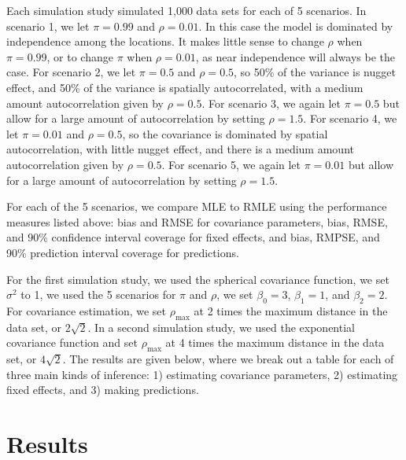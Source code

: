 \documentclass[12pt, titlepage]{article}
\begin{document}
Each simulation study simulated 1,000 data sets for each of 5 scenarios.  In scenario 1, we let $\pi = 0.99$ and $\rho = 0.01$.  In this case the model is dominated by independence among the locations.  It makes little sense to change $\rho$ when $\pi = 0.99$, or to change $\pi$ when $\rho = 0.01$, as near independence will always be the case.  For scenario 2, we let $\pi = 0.5$ and $\rho = 0.5$, so 50\% of the variance is nugget effect, and 50\% of the variance is spatially autocorrelated, with a medium amount autocorrelation given by $\rho = 0.5$.  For scenario 3, we again let $\pi = 0.5$ but allow for a large amount of autocorrelation by setting $\rho = 1.5$.  For scenario 4, we let $\pi = 0.01$ and $\rho = 0.5$, so the covariance is dominated by spatial autocorrelation, with little nugget effect, and there is a medium amount autocorrelation given by $\rho = 0.5$.  For scenario 5, we again let $\pi = 0.01$ but allow for a large amount of autocorrelation by setting $\rho = 1.5$.

For each of the 5 scenarios, we compare MLE to RMLE using the performance measures listed above: bias and RMSE for covariance parameters, bias, RMSE, and 90\% confidence interval coverage for fixed effects, and bias, RMPSE, and 90\% prediction interval coverage for predictions.

For the first simulation study, we used the spherical covariance function, we set $\sigma^2$ to 1, we used the 5 scenarios for $\pi$ and $\rho$, we set $\beta_0 = 3$, $\beta_1 = 1$, and $\beta_2 = 2$.  For covariance estimation, we set $\rho_{\textrm{max}}$ at 2 times the maximum distance in the data set, or $2\sqrt{2}$.   In a second simulation study, we used the exponential covariance function and set $\rho_{\textrm{max}}$ at 4 times the maximum distance in the data set, or $4\sqrt{2}$.  The results are given below, where we break out a table for each of three main kinds of inference: 1) estimating covariance parameters, 2) estimating fixed effects, and 3) making predictions.

\newpage
\section*{Results}
\end{document}
